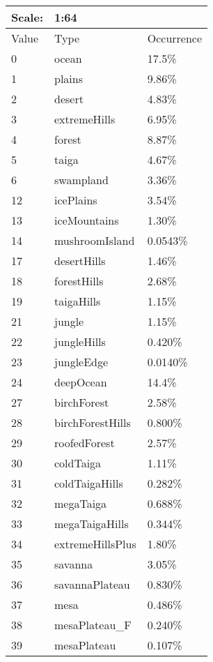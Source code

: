 \documentclass{article}
\begin{document}
	\medskip\noindent
	\begin{tabular}{|l|l|l|}\hline
		Scale: & \multicolumn{2}{|l|}{1:64} \\\hline\hline
		Value  & Type             & Occurrence \\\hline
		0      & ocean            & 17.5\%\\\hline
		1      & plains           & 9.86\%\\\hline
		2      & desert           & 4.83\%\\\hline
		3      & extremeHills     & 6.95\%\\\hline
		4      & forest           & 8.87\%\\\hline
		5      & taiga            & 4.67\%\\\hline
		6      & swampland        & 3.36\%\\\hline
		12     & icePlains        & 3.54\%\\\hline
		13     & iceMountains     & 1.30\%\\\hline
		14     & mushroomIsland   & 0.0543\%\\\hline
		17     & desertHills      & 1.46\%\\\hline
		18     & forestHills      & 2.68\%\\\hline
		19     & taigaHills       & 1.15\%\\\hline
		21     & jungle           & 1.15\%\\\hline
		22     & jungleHills      & 0.420\%\\\hline
		23     & jungleEdge       & 0.0140\%\\\hline
		24     & deepOcean        & 14.4\%\\\hline
		27     & birchForest      & 2.58\%\\\hline
		28     & birchForestHills & 0.800\%\\\hline
		29     & roofedForest     & 2.57\%\\\hline
		30     & coldTaiga        & 1.11\%\\\hline
		31     & coldTaigaHills   & 0.282\%\\\hline
		32     & megaTaiga        & 0.688\%\\\hline
		33     & megaTaigaHills   & 0.344\%\\\hline
		34     & extremeHillsPlus & 1.80\%\\\hline
		35     & savanna          & 3.05\%\\\hline
		36     & savannaPlateau   & 0.830\%\\\hline
		37     & mesa             & 0.486\%\\\hline
		38     & mesaPlateau\_F   & 0.240\%\\\hline
		39     & mesaPlateau      & 0.107\%\\\hline
	\end{tabular}
\end{document}
